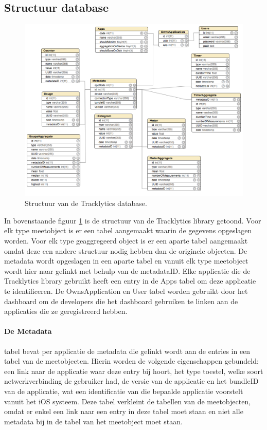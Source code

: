 \subsection{Structuur database}
\begin{figure}[!h]
  \centering
  \includegraphics[scale=0.4]{Afbeeldingen/Implementatie/DatabaseDiagram}
  \caption{Structuur van de Tracklytics database.}
  \label{fig:database}
\end{figure}

In bovenstaande figuur \ref{fig:database} is de structuur van de Tracklytics library getoond. Voor elk type meetobject is er een tabel aangemaakt waarin de gegevens opgeslagen worden. Voor elk type geaggregeerd object is er een aparte tabel aangemaakt omdat deze een andere structuur nodig hebben dan de originele objecten. De metadata wordt opgeslagen in een aparte tabel en vanuit elk type meetobject wordt hier naar gelinkt met behulp van de metadataID. Elke applicatie die de Tracklytics library gebruikt heeft een entry in de Apps tabel om deze applicatie te identificeren. De OwnsApplication en User tabel worden gebruikt door het dashboard om de developers die het dashboard gebruiken te linken aan de applicaties die ze geregistreerd hebben. \\

\paragraph{De Metadata} tabel bevat per applicatie de metadata die gelinkt wordt aan de entries in een tabel van de meetobjecten. Hierin worden de volgende eigenschappen gebundeld: een link naar de applicatie waar deze entry bij hoort, het type toestel, welke soort netwerkverbinding de gebruiker had, de versie van de applicatie en het bundleID van de applicatie, wat een identificatie van die bepaalde applicatie voorstelt vanuit het iOS systeem. Deze tabel verkleint de tabellen van de meetobjecten, omdat er enkel een link naar een entry in deze tabel moet staan en niet alle metadata bij in de tabel van het meetobject moet staan. 

